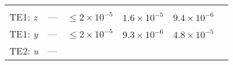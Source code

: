 \documentclass[DM, lsstdraft, toc]{lsstdoc}
\begin{document}
\begin{longtable}[]{@{}llllll@{}}
\begin{minipage}[t]{0.17\columnwidth}
\strut
\end{minipage}\tabularnewline
\begin{minipage}[t]{0.12\columnwidth}\raggedright\strut
TE1: \emph{z}\strut
\end{minipage} & \begin{minipage}[t]{0.06\columnwidth}\raggedright\strut
---\strut
\end{minipage} & \begin{minipage}[t]{0.14\columnwidth}\raggedright\strut
\(\leq 2\times10^{-5}\)\strut
\end{minipage} & \begin{minipage}[t]{0.12\columnwidth}\raggedright\strut
\(1.6\times10^{-5}\) \strut
\end{minipage} & \begin{minipage}[t]{0.12\columnwidth}\raggedright\strut
\(9.4\times10^{-6}\)\strut
\end{minipage} & \begin{minipage}[t]{0.17\columnwidth}\raggedright\strut
\strut
\end{minipage}\tabularnewline
\begin{minipage}[t]{0.12\columnwidth}\raggedright\strut
TE1: \emph{y}\strut
\end{minipage} & \begin{minipage}[t]{0.06\columnwidth}\raggedright\strut
---\strut
\end{minipage} & \begin{minipage}[t]{0.14\columnwidth}\raggedright\strut
\(\leq 2\times10^{-5}\)\strut
\end{minipage} & \begin{minipage}[t]{0.12\columnwidth}\raggedright\strut
\(9.3\times10^{-6}\)\strut
\end{minipage} & \begin{minipage}[t]{0.12\columnwidth}\raggedright\strut
\(4.8\times10^{-5}\)\strut
\end{minipage} & \begin{minipage}[t]{0.17\columnwidth}\raggedright\strut
\strut
\end{minipage}\tabularnewline
\begin{minipage}[t]{0.12\columnwidth}\raggedright\strut
TE2: \emph{u}\strut
\end{minipage} & \begin{minipage}[t]{0.06\columnwidth}\raggedright\strut
---\strut
\end{minipage} & \begin{minipage}[t]{0.14\columnwidth}\raggedright\strut

\end{minipage}
\end{longtable}
\end{document}
